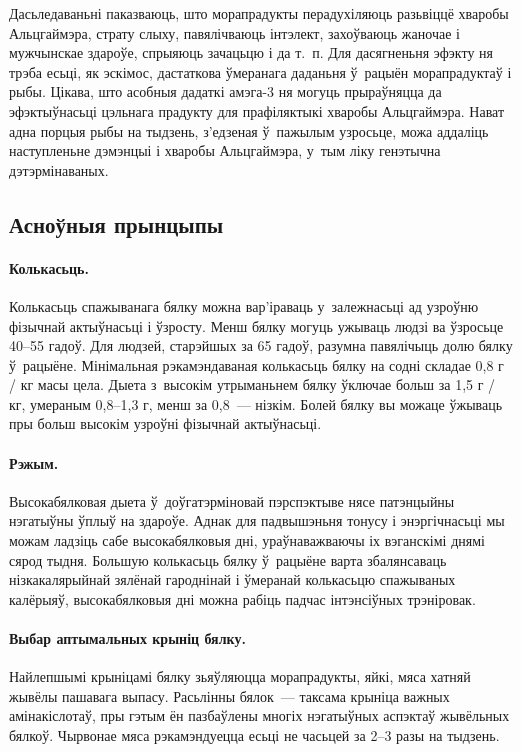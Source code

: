 Дасьледаваньні паказваюць, што морапрадукты перадухіляюць разьвіццё хваробы Альцгаймэра, страту слыху, павялічваюць інтэлект, захоўваюць жаночае і мужчынскае здароўе, спрыяюць зачацьцю і да т.~п. Для дасягненьня эфэкту ня трэба есьці, як эскімос, дастаткова ўмеранага даданьня ў~рацыён морапрадуктаў і рыбы. Цікава, што асобныя дадаткі амэга-3 ня могуць прыраўняцца да эфэктыўнасьці цэльнага прадукту для прафіляктыкі хваробы Альцгаймэра. Нават адна порцыя рыбы на тыдзень, з'едзеная ў~пажылым узросьце, можа аддаліць наступленьне дэмэнцыі і хваробы Альцгаймэра, у~тым ліку генэтычна дэтэрмінаваных.

\subsection{Асноўныя прынцыпы}

\paragraph{Колькасьць.}
Колькасьць спажыванага бялку можна вар'іраваць у~залежнасьці ад узроўню фізычнай актыўнасьці і ўзросту. Менш бялку могуць ужываць людзі ва ўзросьце 40--55 гадоў. Для людзей, старэйшых за 65 гадоў, разумна павялічыць долю бялку ў~рацыёне. Мінімальная рэкамэндаваная колькасьць бялку на содні складае 0,8 г / кг масы цела. Дыета з~высокім утрыманьнем бялку ўключае больш за 1,5 г / кг, умераным 0,8--1,3 г, менш за 0,8~--- нізкім. Болей бялку вы можаце ўжываць пры больш высокім узроўні фізычнай актыўнасьці.

\paragraph{Рэжым.}
Высокабялковая дыета ў~доўгатэрміновай пэрспэктыве нясе патэнцыйны нэгатыўны ўплыў на здароўе. Аднак для падвышэньня тонусу і энэргічнасьці мы можам ладзіць сабе высокабялковыя дні, ураўнаважваючы іх вэганскімі днямі сярод тыдня. Большую колькасьць бялку ў~рацыёне варта збалянсаваць нізкакалярыйнай зялёнай гароднінай і ўмеранай колькасьцю спажываных калёрыяў, высокабялковыя дні можна рабіць падчас інтэнсіўных трэніровак.

\paragraph{Выбар аптымальных крыніц бялку.}
Найлепшымі крыніцамі бялку зьяўляюцца морапрадукты, яйкі, мяса хатняй жывёлы пашавага выпасу. Расьлінны бялок~--- таксама крыніца важных амінакіслотаў, пры гэтым ён пазбаўлены многіх нэгатыўных аспэктаў жывёльных бялкоў. Чырвонае мяса рэкамэндуецца есьці не часьцей за 2--3 разы на тыдзень.

